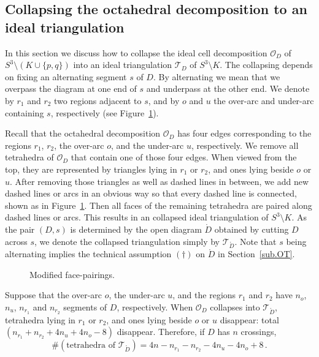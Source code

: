 \documentclass[12pt,reqno]{amsart}
\theoremstyle{definition}
\def\calO{\mathcal O}
\def\calT{\mathcal T}
\renewcommand{\Ddot}{\mathring{D}}
\begin{document}
\subsection{Collapsing the octahedral decomposition to an ideal triangulation}  
\label{sec.collap}

In this section we discuss how to collapse the ideal cell decomposition $\calO_D$
of $S^3\setminus (K \cup \{p,q\})$ into an ideal triangulation $\calT_D$ of
$S^3\setminus K$. The collapsing depends on fixing an alternating segment $s$
of $D$. By alternating we mean that we overpass the diagram at one end
of $s$ and underpass at the other end. We denote by $r_1$ and $r_2$ two regions
adjacent to $s$, and by $o$ and $u$ the over-arc and under-arc containing
$s$, respectively (see Figure~\ref{fig.region2}).

Recall that the octahedral decomposition $\calO_D$ has four edges
corresponding to the regions $r_1$, $r_2$, the over-arc $o$, and the under-arc
$u$, respectively. We remove all tetrahedra of $\calO_D$ that contain
one of those four edges.
When viewed from the top, they are represented by triangles lying in $r_1$ or
$r_2$, and ones lying beside $o$ or $u$. After removing those triangles as well
as dashed lines in between, we add new dashed lines or arcs in an obvious way
so that every dashed line is connected, shown as in Figure~\ref{fig.region2}.
Then all faces of the remaining tetrahedra are paired along dashed lines
or arcs. This results in an collapsed ideal triangulation
of $S^3 \setminus K$.
As the pair $(D,s)$ is determined by the open diagram $\Ddot$ obtained by cutting
$D$ across $s$, we denote the collapsed triangulation simply by
$\calT_{\Ddot}$. Note that $s$ being alternating implies the technical
assumption $(\dagger)$ on $\Ddot$ in Section~\ref{sub.OT}.

\begin{figure}[htpb!]

\caption{Modified face-pairings.}
\label{fig.region2}
\end{figure}


Suppose that the over-arc $o$, the under-arc $u$, and the regions $r_1$ 
and $r_2$ have $n_o$, $n_u$, $n_{r_1}$ and $n_{r_2}$ segments of
$D$, respectively. When $\calO_D$ collapses into
$\calT_{\Ddot}$, tetrahedra lying in $r_1$ or $r_2$, and ones lying beside $o$ or
$u$ disappear: total $(n_{r_1}+n_{r_2} + 4n_u+4n_o-8)$ disappear. 
Therefore, if $D$ has $n$ crossings, 
\begin{equation*}
\# ( \textrm{tetrahedra of } \calT_{\Ddot}) = 4n-n_{r_1}-n_{r_2}-4n_u-4n_o+8 \,.
\end{equation*}
\end{document}
